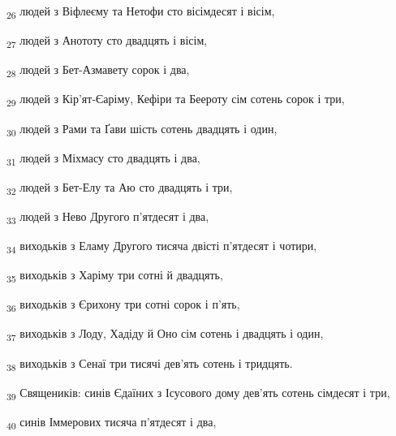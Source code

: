 \begin{tcolorbox}
\textsubscript{26} людей з Віфлеєму та Нетофи сто вісімдесят і вісім,
\end{tcolorbox}
\begin{tcolorbox}
\textsubscript{27} людей з Анототу сто двадцять і вісім,
\end{tcolorbox}
\begin{tcolorbox}
\textsubscript{28} людей з Бет-Азмавету сорок і два,
\end{tcolorbox}
\begin{tcolorbox}
\textsubscript{29} людей з Кір'ят-Єаріму, Кефіри та Беероту сім сотень сорок і три,
\end{tcolorbox}
\begin{tcolorbox}
\textsubscript{30} людей з Рами та Ґави шість сотень двадцять і один,
\end{tcolorbox}
\begin{tcolorbox}
\textsubscript{31} людей з Міхмасу сто двадцять і два,
\end{tcolorbox}
\begin{tcolorbox}
\textsubscript{32} людей з Бет-Елу та Аю сто двадцять і три,
\end{tcolorbox}
\begin{tcolorbox}
\textsubscript{33} людей з Нево Другого п'ятдесят і два,
\end{tcolorbox}
\begin{tcolorbox}
\textsubscript{34} виходьків з Еламу Другого тисяча двісті п'ятдесят і чотири,
\end{tcolorbox}
\begin{tcolorbox}
\textsubscript{35} виходьків з Харіму три сотні й двадцять,
\end{tcolorbox}
\begin{tcolorbox}
\textsubscript{36} виходьків з Єрихону три сотні сорок і п'ять,
\end{tcolorbox}
\begin{tcolorbox}
\textsubscript{37} виходьків з Лоду, Хадіду й Оно сім сотень і двадцять і один,
\end{tcolorbox}
\begin{tcolorbox}
\textsubscript{38} виходьків з Сенаї три тисячі дев'ять сотень і тридцять.
\end{tcolorbox}
\begin{tcolorbox}
\textsubscript{39} Священиків: синів Єдаїних з Ісусового дому дев'ять сотень сімдесят і три,
\end{tcolorbox}
\begin{tcolorbox}
\textsubscript{40} синів Іммерових тисяча п'ятдесят і два,
\end{tcolorbox}
